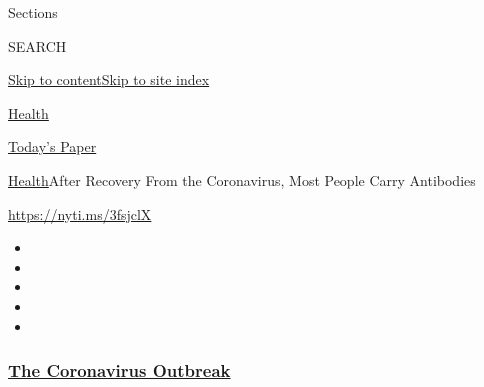 Sections

SEARCH

\protect\hyperlink{site-content}{Skip to
content}\protect\hyperlink{site-index}{Skip to site index}

\href{https://www.nytimes3xbfgragh.onion/section/health}{Health}

\href{https://myaccount.nytimes3xbfgragh.onion/auth/login?response_type=cookie\&client_id=vi}{}

\href{https://www.nytimes3xbfgragh.onion/section/todayspaper}{Today's
Paper}

\href{/section/health}{Health}\textbar{}After Recovery From the
Coronavirus, Most People Carry Antibodies

\url{https://nyti.ms/3fsjclX}

\begin{itemize}
\item
\item
\item
\item
\item
\end{itemize}

\hypertarget{the-coronavirus-outbreak}{%
\subsubsection{\texorpdfstring{\href{https://www.nytimes3xbfgragh.onion/news-event/coronavirus?name=styln-coronavirus-national\&region=TOP_BANNER\&block=storyline_menu_recirc\&action=click\&pgtype=Article\&impression_id=c9eecf10-f283-11ea-b022-6936941775de\&variant=undefined}{The
Coronavirus
Outbreak}}{The Coronavirus Outbreak}}\label{the-coronavirus-outbreak}}


